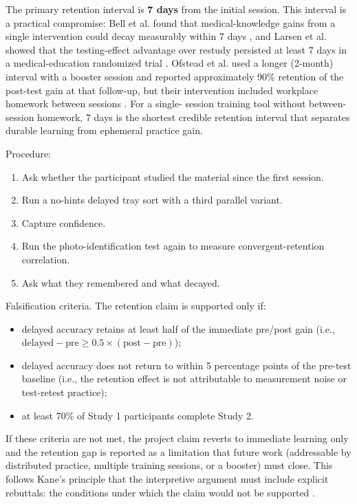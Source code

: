 \documentclass[10pt,a4paper]{article}
\begin{document}
The primary retention interval is \textbf{7 days} from the initial session. This
interval is a practical compromise: Bell et al. found that medical-knowledge
gains from a single intervention could decay measurably within 7 days
\cite{bell-et-al-2008}, and Larsen et al. showed that the testing-effect
advantage over restudy persisted at least 7 days in a medical-education
randomized trial \cite{larsen-et-al-2009}. Ofstead et al. used a longer
(2-month) interval with a booster session and reported approximately
90\% retention of the post-test gain at that follow-up, but their intervention
included workplace homework between sessions \cite{ofstead-et-al-2023}. For a single-
session training tool without between-session homework, 7 days is the shortest
credible retention interval that separates durable learning from ephemeral
practice gain.

Procedure:
\begin{enumerate}
  \item Ask whether the participant studied the material since the first session.
  \item Run a no-hints delayed tray sort with a third parallel variant.
  \item Capture confidence.
  \item Run the photo-identification test again to measure convergent-retention correlation.
  \item Ask what they remembered and what decayed.
\end{enumerate}

Falsification criteria. The retention claim is supported only if:
\begin{itemize}
  \item delayed accuracy retains at least half of the immediate pre/post gain
  (i.e., $\text{delayed} - \text{pre} \ge 0.5 \times (\text{post} - \text{pre})$);
  \item delayed accuracy does not return to within 5 percentage points of the
  pre-test baseline (i.e., the retention effect is not attributable to measurement
  noise or test-retest practice);
  \item at least 70\% of Study 1 participants complete Study 2.
\end{itemize}
If these criteria are not met, the project claim reverts to immediate learning
only and the retention gap is reported as a limitation that future work
(addressable by distributed practice, multiple training sessions, or a booster)
must close. This follows Kane's principle that the interpretive argument must
include explicit rebuttals: the conditions under which the claim would not be
supported \cite{kane-validity-2013}.
\end{document}
